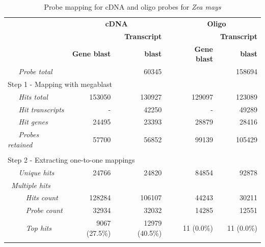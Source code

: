 \begin{table}
	\centering
	\begin{threeparttable}
	\begin{footnotesize}
	\caption{Probe mapping for cDNA and oligo probes for \textit{Zea mays}}
	\label{tab:magic-probemap}
	\begin{tabular}{@{}p{3cm}r|rcr|r}
	\toprule

	& \multicolumn{2}{c}{\textbf{cDNA}} & \phantom{a} & 
	\multicolumn{2}{c}{\textbf{Oligo}} \\
	
	\cmidrule{2-3} \cmidrule{5-6}
	
	& & \textbf{Transcript}	&& & \textbf{Transcript} \\
	& \textbf{Gene blast} & \textbf{blast} && \textbf{Gene blast}	& 
	\textbf{blast} \\
	
	\midrule
	
	{\it ~~~Probe total\tnote{2}} & \multicolumn{2}{r}{60345} &&	
			\multicolumn{2}{r}{158694} \\[1.5ex]

		\multicolumn{6}{l}{Step 1 - Mapping with megablast} \\[.2ex]
	{\it ~~~Hits total\tnote{3}} & 153050 & 130927 && 129097 & 123089 \\
	{\it ~~~Hit transcripts\tnote{4}} & - & 42250 && - & 49289 \\
	{\it ~~~Hit genes\tnote{5}} & 24495 & 23393 && 28879 & 
	28416 \\
	{\it ~~~Probes retained} & 57700 & 56852 && 99139 & 105429 \\
	
	\multicolumn{6}{l}{}\\
		
		\multicolumn{6}{l}{Step 2 - Extracting one-to-one mappings} 
		\\[.2ex]
	{\it ~~~Unique hits\tnote{6}} & 24766 & 24820 && 84854 & 92878 \\
	\multicolumn{6}{l}{{\it ~Multiple hits}} \\
	{\it ~~~~~Hits count\tnote{3}} & 128284 & 106107 && 44243 & 30211 \\
	{\it ~~~~~Probe count} & 32934 & 32032 && 14285 & 12551 \\
	{\it ~~~~~Top hits\tnote{7}} & 9067 (27.5\%) & 12979 (40.5\%) && 11 (0.0\%) 
	& 11 (0.0\%)\\
	
	\multicolumn{6}{l}{}\\
				

\end{tabular}
\end{footnotesize}
\end{threeparttable}
\end{table}
